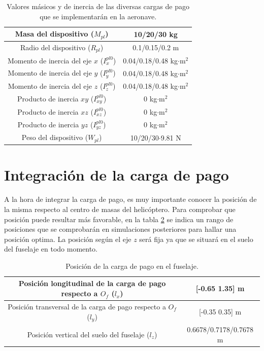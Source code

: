 \begin{table}[htbp]
	\centering
	\begin{tabular}{|>{\columncolor{Gray}}c|c|}
		\hline
		\cellcolor{Gray}Masa del dispositivo ($M_{pl}$) & 10/20/30 kg \\ \hline
		\cellcolor{Gray}Radio del dispositivo ($R_{pl}$) & 0.1/0.15/0.2 m \\ \hline
		\cellcolor{Gray}Momento de inercia del eje $x$ ($I_{x}^{pl0}$) & 0.04/0.18/0.48 kg$\cdot$m$^2$ \\ \hline
		\cellcolor{Gray}Momento de inercia del eje $y$ ($I_{y}^{pl0}$) & 0.04/0.18/0.48 kg$\cdot$m$^2$ \\ \hline
		\cellcolor{Gray}Momento de inercia del eje $z$ ($I_{z}^{pl0}$) & 0.04/0.18/0.48 kg$\cdot$m$^2$ \\ \hline
		\cellcolor{Gray}Producto de inercia $xy$ ($I_{xy}^{pl0}$)& 0 kg$\cdot$m$^2$ \\ \hline
		\cellcolor{Gray}Producto de inercia $xz$ ($I_{xz}^{pl0}$)& 0 kg$\cdot$m$^2$ \\ \hline
		\cellcolor{Gray}Producto de inercia $yz$ ($I_{yz}^{pl0}$)& 0 kg$\cdot$m$^2$ \\ \hline
		\cellcolor{Gray}Peso del dispositivo ($W_{pl}$)& 10/20/30$\cdot$9.81 N \\ \hline
	\end{tabular}%
	\caption{Valores másicos y de inercia de las diversas cargas de pago que se implementarán en la aeronave.}
	\label{tablaPL}
\end{table}%

\section{Integración de la carga de pago}

A la hora de integrar la carga de pago, es muy importante conocer la posición de la misma respecto al centro de masas del helicóptero. Para comprobar que posición puede resultar más favorable, en la tabla \ref{CGPL} se indica un rango de posiciones que se comprobarán en simulaciones posteriores para hallar una posición optima. La posición según el eje $z$ será fija ya que se situará en el suelo del fuselaje en todo momento.

\begin{table}[htbp]
	\centering
	\begin{tabular}{|>{\columncolor{Gray}}c|c|}
		\hline
		\cellcolor{Gray}Posición longitudinal de la carga de pago respecto a $O_f$ ($l_x$) & [-0.65 1.35] m \\ \hline
		\cellcolor{Gray}Posición transversal de la carga de pago respecto a $O_f$ ($l_y$) & [-0.35 0.35] m \\ \hline
		\cellcolor{Gray}Posición vertical del suelo del fuselaje ($l_z$) & 0.6678/0.7178/0.7678 m \\ \hline
	\end{tabular}%
	\caption{Posición de la carga de pago en el fuselaje.}
	\label{CGPL}
\end{table}%

